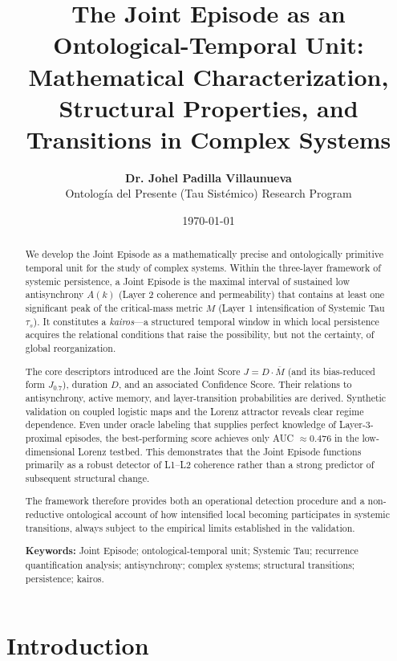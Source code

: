 \documentclass[11pt,a4paper]{article}
\title{\textbf{The Joint Episode as an Ontological-Temporal Unit:}\\[0.25em]
\large Mathematical Characterization, Structural Properties, and Transitions in Complex Systems}
\author{
    \textbf{Dr. Johel Padilla Villaunueva}\\[0.2em]
    \small Ontología del Presente (Tau Sistémico) Research Program
}
\date{\today}
\begin{document}
\maketitle

\begin{abstract}
\noindent
We develop the Joint Episode as a mathematically precise and ontologically primitive temporal unit for the study of complex systems. Within the three-layer framework of systemic persistence, a Joint Episode is the maximal interval of sustained low antisynchrony $A(k)$ (Layer 2 coherence and permeability) that contains at least one significant peak of the critical-mass metric $M$ (Layer 1 intensification of Systemic Tau $\tau_s$). It constitutes a \textit{kairos}---a structured temporal window in which local persistence acquires the relational conditions that raise the possibility, but not the certainty, of global reorganization.

The core descriptors introduced are the Joint Score $J = D \cdot \overline{M}$ (and its bias-reduced form $J_{0.7}$), duration $D$, and an associated Confidence Score. Their relations to antisynchrony, active memory, and layer-transition probabilities are derived. Synthetic validation on coupled logistic maps and the Lorenz attractor reveals clear regime dependence. Even under oracle labeling that supplies perfect knowledge of Layer-3-proximal episodes, the best-performing score achieves only AUC $\approx 0.476$ in the low-dimensional Lorenz testbed. This demonstrates that the Joint Episode functions primarily as a robust detector of L1--L2 coherence rather than a strong predictor of subsequent structural change.

The framework therefore provides both an operational detection procedure and a non-reductive ontological account of how intensified local becoming participates in systemic transitions, always subject to the empirical limits established in the validation.

\vspace{0.1em}
\noindent\textbf{Keywords:} Joint Episode; ontological-temporal unit; Systemic Tau; recurrence quantification analysis; antisynchrony; complex systems; structural transitions; persistence; kairos.
\end{abstract}

\vspace{0.5em}

\section{Introduction}

\end{document}
